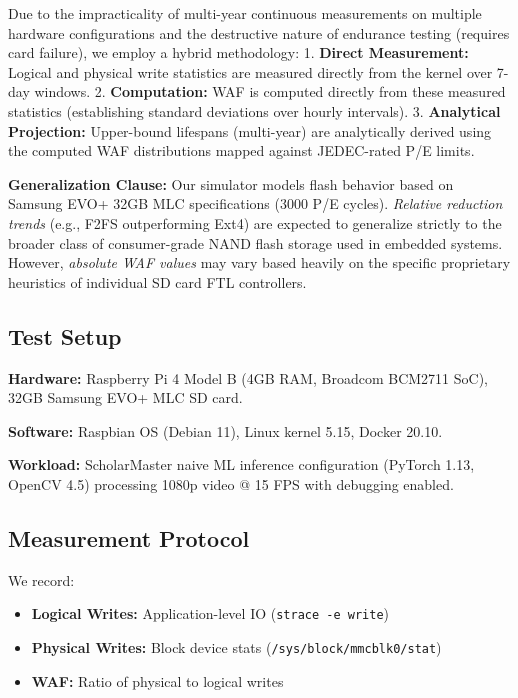 \documentclass[conference]{IEEEtran}
\begin{document}
Due to the impracticality of multi-year continuous measurements on multiple hardware configurations and the destructive nature of endurance testing (requires card failure), we employ a hybrid methodology:
1. \textbf{Direct Measurement:} Logical and physical write statistics are measured directly from the kernel over 7-day windows.
2. \textbf{Computation:} WAF is computed directly from these measured statistics (establishing standard deviations over hourly intervals).
3. \textbf{Analytical Projection:} Upper-bound lifespans (multi-year) are analytically derived using the computed WAF distributions mapped against JEDEC-rated P/E limits.

\textbf{Generalization Clause:} Our simulator models flash behavior based on Samsung EVO+ 32GB MLC specifications (3000 P/E cycles). \textit{Relative reduction trends} (e.g., F2FS outperforming Ext4) are expected to generalize strictly to the broader class of consumer-grade NAND flash storage used in embedded systems. However, \textit{absolute WAF values} may vary based heavily on the specific proprietary heuristics of individual SD card FTL controllers.

\subsection{Test Setup}

\textbf{Hardware:} Raspberry Pi 4 Model B (4GB RAM, Broadcom BCM2711 SoC), 32GB Samsung EVO+ MLC SD card.

\textbf{Software:} Raspbian OS (Debian 11), Linux kernel 5.15, Docker 20.10.

\textbf{Workload:} ScholarMaster naive ML inference configuration (PyTorch 1.13, OpenCV 4.5) processing 1080p video @ 15 FPS with debugging enabled.

\subsection{Measurement Protocol}

We record:
\begin{itemize}
    \item \textbf{Logical Writes:} Application-level IO (\texttt{strace -e write})
    \item \textbf{Physical Writes:} Block device stats (\texttt{/sys/block/mmcblk0/stat})
    \item \textbf{WAF:} Ratio of physical to logical writes
\end{itemize}
\end{document}

